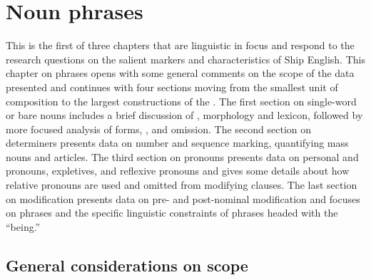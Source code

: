 \chapter{{Noun phrases}}

This is the first of three chapters that are linguistic in focus and respond to the research questions on the salient markers and characteristics of Ship English. This chapter on  phrases opens with some general comments on the scope of the data presented and continues with four sections moving from the smallest unit of  composition to the largest constructions of the . The first section on single-word or bare nouns includes a brief discussion of , morphology and lexicon, followed by more focused analysis of  forms, , and  omission. The second section on determiners presents data on number and sequence marking, quantifying mass nouns and articles. The third section on pronouns presents data on personal and  pronouns, expletives,  and reflexive pronouns and gives some details about how relative pronouns are used and omitted from modifying clauses. The last section on  modification presents data on pre- and post-nominal modification and focuses on  phrases and the specific linguistic constraints of phrases headed with the  “being.” 

\section{{General considerations on scope}}%


